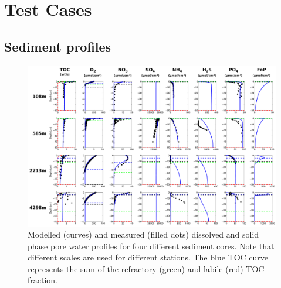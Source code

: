\documentclass[gmd, manuscript]{copernicus}
\begin{document}
\section {Test Cases}

\subsection{Sediment profiles}

\begin{figure}[htbp]
\begin{center}
	\includegraphics[width=1.0\textwidth]{figures/Profiles/0_ALL_PROFILES_COMBINED.pdf}
	\caption{Modelled (curves) and measured (filled dots) dissolved and solid phase pore water profiles for four different sediment cores. Note that different 
	scales are used for different stations. The blue TOC curve represents the sum of the refractory (green) and labile (red) TOC fraction.}
	\label{fig:Sediment_profiles}
	\end{center}
\end{figure}
\end{document}

